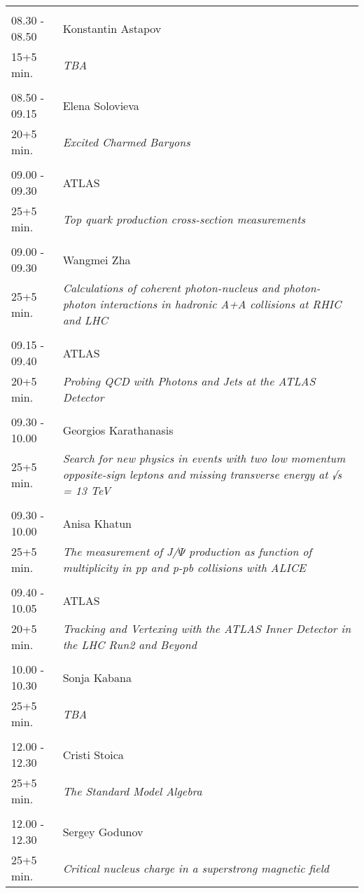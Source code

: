 \begin{longtable}{p{3cm}p{13cm}}
 & \\ 
08.30 - 08.50 & Konstantin Astapov\\ 
15+5 min. & {\it TBA}\\ 
 & \\ 
08.50 - 09.15 & Elena Solovieva\\ 
20+5 min. & {\it Excited Charmed Baryons}\\ 
 & \\ 
09.00 - 09.30 & ATLAS\\ 
25+5 min. & {\it Top quark production cross-section measurements}\\ 
 & \\ 
09.00 - 09.30 & Wangmei Zha\\ 
25+5 min. & {\it Calculations of coherent photon-nucleus and photon-photon interactions in hadronic A+A collisions at RHIC and LHC}\\ 
 & \\ 
09.15 - 09.40 & ATLAS\\ 
20+5 min. & {\it Probing QCD with Photons and Jets at the ATLAS Detector}\\ 
 & \\ 
09.30 - 10.00 & Georgios Karathanasis\\ 
25+5 min. & {\it Search for new physics in events with two low momentum opposite-sign leptons and missing transverse energy at √s = 13 TeV}\\ 
 & \\ 
09.30 - 10.00 & Anisa Khatun\\ 
25+5 min. & {\it The measurement of J/$\Psi$ production as function of  multiplicity in pp and p-pb collisions with ALICE}\\ 
 & \\ 
09.40 - 10.05 & ATLAS\\ 
20+5 min. & {\it Tracking and Vertexing with the ATLAS Inner Detector in the LHC Run2 and Beyond}\\ 
 & \\ 
10.00 - 10.30 & Sonja Kabana\\ 
25+5 min. & {\it TBA}\\ 
 & \\ 
12.00 - 12.30 & Cristi Stoica\\ 
25+5 min. & {\it The Standard Model Algebra}\\ 
 & \\ 
12.00 - 12.30 & Sergey Godunov\\ 
25+5 min. & {\it Critical nucleus charge in a superstrong magnetic field}\\ 

\end{longtable}
